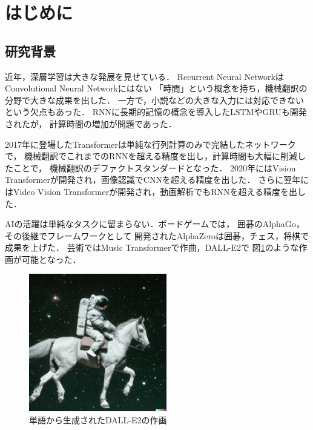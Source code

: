 \section{はじめに}

\subsection{研究背景}
近年，深層学習は大きな発展を見せている．
Recurrent Neural Network\cite{rnn}はConvolutional Neural Network\cite{cnn}にはない
「時間」という概念を持ち，機械翻訳の分野で大きな成果を出した．
一方で，小説などの大きな入力には対応できないという欠点もあった．
RNNに長期的記憶の概念を導入したLSTM\cite{lstm}やGRU\cite{gru}も開発されたが，
計算時間の増加が問題であった．

2017年に登場したTransformer\cite{transformer}は単純な行列計算のみで完結したネットワークで，
機械翻訳でこれまでのRNNを超える精度を出し，計算時間も大幅に削減したことで，
機械翻訳のデファクトスタンダードとなった．
2020年にはVision Transformer\cite{vit}が開発され，画像認識でCNNを超える精度を出した．
さらに翌年にはVideo Vision Transformer\cite{vivit}が開発され，動画解析でもRNNを超える精度を出した．

AIの活躍は単純なタスクに留まらない．ボードゲームでは，
囲碁のAlphaGo\cite{alphago}，その後継でフレームワークとして
開発されたAlphaZero\cite{alphazero}は囲碁，チェス，将棋で成果を上げた．
芸術ではMusic Transformer\cite{mut}で作曲，DALL-E2\cite{dalle2}で
図\ref{astronaut}のような作画が可能となった．

\begin{figure}[b]
  \begin{center}
    \includegraphics[width=60mm]{images/quote/astronaut.jpg}
  \end{center}
  \caption[単語から生成されたDALL-E2の作画]{単語から生成されたDALL-E2の作画\cite{demo}}
  \label{astronaut}
\end{figure}
\clearpage

